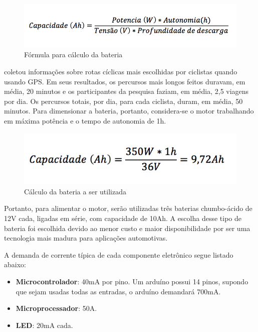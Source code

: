 	\graphicspath{{figuras/}}
	\begin{figure}[h!]
	\centering
	\includegraphics[scale=1.0]{capacidade_bateria}
	\caption{Fórmula para cálculo da bateria}
	\label{img:formula_capacidade}
	\end{figure}
	

	 coletou informações sobre rotas cíclicas mais escolhidas por ciclistas quando usando GPS. Em seus resultados, os percursos mais longos feitos duravam, em média, 20 minutos e os participantes da pesquisa faziam, em média, 2,5 viagens por dia. Os percursos totais, por dia, para cada ciclista, duram, em média, 50 minutos. Para dimensionar a bateria, portanto, considera-se o motor trabalhando em máxima potência e o tempo de autonomia de 1h.
	
	\graphicspath{{figuras/}}
	\begin{figure}[h!]
	\centering
	\includegraphics[scale=1.0]{calculo_capacidade}
	\caption{Cálculo da bateria a ser utilizada}
	\label{img:calculo_bateria}
	\end{figure}
	
	Portanto, para alimentar o motor, serão utilizadas três baterias chumbo-ácido de 12V cada, ligadas em série, com capacidade de 10Ah. A escolha desse tipo de bateria foi escolhida devido ao menor custo e maior disponibilidade por ser uma tecnologia mais madura para aplicações automotivas.

	A demanda de corrente típica de cada componente eletrônico segue listado abaixo:
	
	\begin{itemize}
		\item \textbf{Microcontrolador}: 40mA por pino. Um arduíno possui 14 pinos, supondo que sejam usadas todas as entradas, o arduíno demandará 700mA.
		\item \textbf{Microprocessador}: 50A.
		\item \textbf{LED}: 20mA cada.

	\end{itemize}

